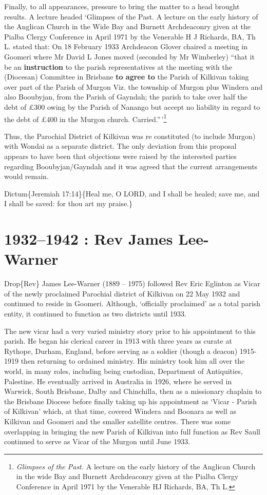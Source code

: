 Finally, to all appearances, pressure to bring the matter to a head brought results. A lecture headed `Glimpses of the Past. A lecture on the early history of the Anglican Church in the Wide Bay and Burnett Archdeaconry given at the Pialba Clergy Conference in April 1971 by the Venerable H J Richards, BA, Th L. stated that: On 18 February 1933 Archdeacon Glover chaired a meeting in Goomeri where Mr David L Jones moved (seconded by Mr Wimberley) ``that it be an \textbf{instruction} to the parish representatives at the meeting with the (Diocesan) Committee in Brisbane \textbf{to agree to} the Parish of Kilkivan taking over part of the Parish of Murgon Viz. the township of Murgon plus Windera and also Booubyjan, from the Parish of Gayndah; the parish to take over half the debt of £300 owing by the Parish of Nanango but accept no liability in regard to the debt of £400 in the Murgon church. Carried.''\,'\footnote{\emph{Glimpses of the Past.} A lecture on the early history of the Anglican Church in the wide Bay and Burnett Archdeaconry given at the Pialba Clergy Conference in April 1971 by the Venerable HJ Richards, BA, Th L.}

Thus, the Parochial District of Kilkivan was re constituted (to include Murgon) with Wondai as a separate district. The only deviation from this proposal appears to have been that objections were raised by the interested parties regarding Booubyjan/Gayndah and it was agreed that the current arrangements would remain.

Dictum\{Jeremiah 17:14\}\{Heal me, O LORD, and I shall be healed; save me, and I shall be saved: for thou art my praise.\}

\hypertarget{rev-james-lee-warner}{%
\chapter{1932--1942 : Rev James Lee-Warner}\label{rev-james-lee-warner}}

Drop\{Rev\} James Lee-Warner (1889 -- 1975) followed Rev Eric Eglinton as Vicar of the newly proclaimed Parochial district of Kilkivan on 22 May 1932 and continued to reside in Goomeri. Although, `officially proclaimed' as a total parish entity, it continued to function as two districts until 1933.

The new vicar had a very varied ministry story prior to his appointment to this parish. He began his clerical career in 1913 with three years as curate at Rythope, Durham, England, before serving as a soldier (though a deacon) 1915-1919 then returning to ordained ministry. His ministry took him all over the world, in many roles, including being custodian, Department of Antiquities, Palestine. He eventually arrived in Australia in 1926, where he served in Warwick, South Brisbane, Dalby and Chinchilla, then as a missionary chaplain to the Brisbane Diocese before finally taking up his appointment as `Vicar - Parish of Kilkivan' which, at that time, covered Windera and Boonara as well as Kilkivan and Goomeri and the smaller satellite centres. There was some overlapping in bringing the new Parish of Kilkivan into full function as Rev Saull continued to serve as Vicar of the Murgon until June 1933.

